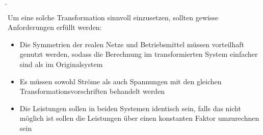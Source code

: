 \begin{frame}
    \b{
        Um eine solche Transformation sinnvoll einzusetzen, sollten gewisse Anforderungen erfüllt werden:

    \begin{itemize}
        \item<1-> [1.]Die Symmetrien der realen Netze und Betriebsmittel müssen vorteilhaft genutzt werden,
        sodass die Berechnung im transformierten System einfacher sind als im Originalsystem
        \item<2-> [2.]Es müssen sowohl Ströme als auch Spannungen mit den gleichen Transformationsvorschriften behandelt werden
        \item<3-> [3.]Die Leistungen sollen in beiden Systemen identisch sein, falls das nicht möglich ist sollen die Leistungen über einen konstanten Faktor umzurechnen sein
    \end{itemize}
    }

\end{frame}





